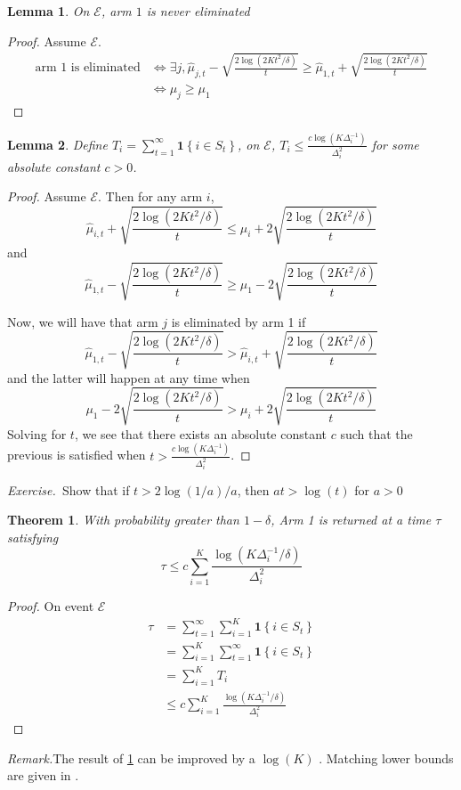\documentclass[11pt]{article}
\newtheorem{theorem}{Theorem}
\newtheorem{lemma}{Lemma}
\newcommand{\exercise}{\noindent\textit{Exercise.\  }}
\newcommand{\remark}{\noindent\textit{Remark.}}
\newcommand{\mc}[1]{\mathcal{#1}}
\newcommand{\cE}{\mathcal{E}}
\newcommand{\1}[1]{\mathbf{1}\left\{#1\right\}}
\begin{document}
\begin{lemma}
    On $\mc{E}$, arm $1$ is never eliminated
\end{lemma}
\begin{proof}
    Assume $\cE$.
    \begin{align*}        
         \text{arm 1 is eliminated} &\iff  \exists j, \hat{\mu}_{j,t} - \sqrt{\frac{2\log(2Kt^2/\delta)}{t}} \geq \hat{\mu}_{1,t} + \sqrt{\frac{2\log(2Kt^2/\delta)}{t}}\\
         &\iff \mu_j \geq \mu_1
    \end{align*}
\end{proof}

\begin{lemma}
    Define $T_i = \sum_{t=1}^{\infty} \1{i\in S_t}$, on $\mc{E}$, $T_i \leq \frac{c \log(K\Delta_i^{-1})}{\Delta_i^2}$ for some absolute constant $c > 0$.
\end{lemma}
\begin{proof}
    Assume $\cE$. Then for any arm $i$,
    \[\hat{\mu}_{i,t}+\sqrt{\frac{2\log(2Kt^2/\delta)}{t}} \leq \mu_{i}+2\sqrt{\frac{2\log(2Kt^2/\delta)}{t}}\]
    and
    \[\hat{\mu}_{1,t}-\sqrt{\frac{2\log(2Kt^2/\delta)}{t}} \geq \mu_{1}-2\sqrt{\frac{2\log(2Kt^2/\delta)}{t}}\]

    Now, we will have that arm $j$ is eliminated by arm 1 if
    \[\hat{\mu}_{1,t}-\sqrt{\frac{2\log(2Kt^2/\delta)}{t}}  >\hat{\mu}_{i,t}+\sqrt{\frac{2\log(2Kt^2/\delta)}{t}}\]
    and the latter will happen at any time when 
    \[ \mu_{1}-2\sqrt{\frac{2\log(2Kt^2/\delta)}{t}} > \mu_{i}+2\sqrt{\frac{2\log(2Kt^2/\delta)}{t}}\]
    Solving for $t$, we see that there exists an absolute constant $c$ such that the previous is satisfied when $t > \frac{c \log(K\Delta_i^{-1})}{\Delta_i^2}$.
\end{proof}
\exercise Show that if $t > 2\log(1/a)/a$, then $at > \log(t)$ for $a> 0$
\begin{theorem}\label{thm:elimination-sample-complexity}
    With probability greater than $1-\delta$, Arm 1 is returned at a time $\tau$ satisfying 
    \[\tau \leq c\sum_{i=1}^K \frac{\log(K\Delta_i^{-1}/\delta)}{\Delta_i^2}\]
\end{theorem}
\begin{proof}
    On event $\mc{E}$
    \begin{align*}
        \tau 
        &= \sum_{t=1}^{\infty}\sum_{i=1}^{K}\1{i\in S_t}\\
        &= \sum_{i=1}^{K}\sum_{t=1}^{\infty}\1{i\in S_t}\\
        &= \sum_{i=1}^K T_i\\
        &\leq c\sum_{i=1}^K \frac{\log(K\Delta_i^{-1}/\delta)}{\Delta_i^2}
    \end{align*}
\end{proof}
\remark The result of \ref{thm:elimination-sample-complexity} can be improved by a $\log(K)$ \cite{jamieson2014lil}. Matching lower bounds are given in \cite{kaufmann2016complexity}.
\end{document}
